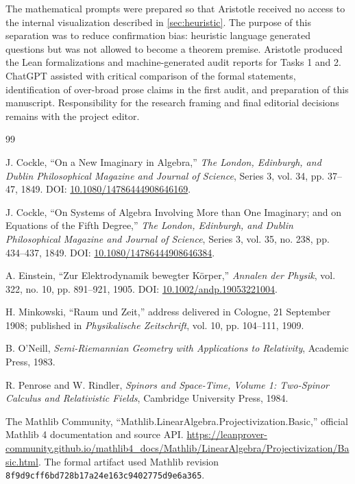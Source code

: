 \documentclass[11pt,a4paper]{article}
\begin{document}
The mathematical prompts were prepared so that Aristotle received no access to the internal visualization described in \cref{sec:heuristic}.  The purpose of this separation was to reduce confirmation bias: heuristic language generated questions but was not allowed to become a theorem premise.  Aristotle produced the Lean formalizations and machine-generated audit reports for Tasks 1 and 2.  ChatGPT assisted with critical comparison of the formal statements, identification of over-broad prose claims in the first audit, and preparation of this manuscript.  Responsibility for the research framing and final editorial decisions remains with the project editor.

\begin{thebibliography}{99}

J. Cockle,
``On a New Imaginary in Algebra,''
\emph{The London, Edinburgh, and Dublin Philosophical Magazine and Journal of Science}, Series 3, vol. 34, pp. 37--47, 1849.
DOI: \href{https://doi.org/10.1080/14786444908646169}{10.1080/14786444908646169}.

J. Cockle,
``On Systems of Algebra Involving More than One Imaginary; and on Equations of the Fifth Degree,''
\emph{The London, Edinburgh, and Dublin Philosophical Magazine and Journal of Science}, Series 3, vol. 35, no. 238, pp. 434--437, 1849.
DOI: \href{https://doi.org/10.1080/14786444908646384}{10.1080/14786444908646384}.

A. Einstein,
``Zur Elektrodynamik bewegter K\"orper,''
\emph{Annalen der Physik}, vol. 322, no. 10, pp. 891--921, 1905.
DOI: \href{https://doi.org/10.1002/andp.19053221004}{10.1002/andp.19053221004}.

H. Minkowski,
``Raum und Zeit,''
address delivered in Cologne, 21 September 1908; published in
\emph{Physikalische Zeitschrift}, vol. 10, pp. 104--111, 1909.

B. O'Neill,
\emph{Semi-Riemannian Geometry with Applications to Relativity},
Academic Press, 1983.

R. Penrose and W. Rindler,
\emph{Spinors and Space-Time, Volume 1: Two-Spinor Calculus and Relativistic Fields},
Cambridge University Press, 1984.

The Mathlib Community,
``Mathlib.LinearAlgebra.Projectivization.Basic,''
official Mathlib 4 documentation and source API.
\url{https://leanprover-community.github.io/mathlib4_docs/Mathlib/LinearAlgebra/Projectivization/Basic.html}.
The formal artifact used Mathlib revision \texttt{8f9d9cff6bd728b17a24e163c9402775d9e6a365}.


\end{thebibliography}
\end{document}
